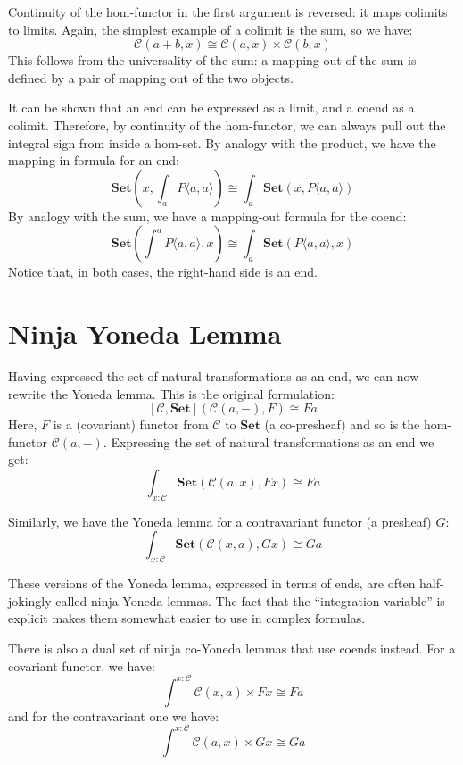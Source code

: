 \documentclass[DaoFP]{subfiles}
\begin{document}
Continuity of the hom-functor in the first argument is reversed: it maps colimits to limits. Again, the simplest example of a colimit is the sum, so we have:
\[ \mathcal{C}(a + b, x) \cong \mathcal{C}(a, x) \times \mathcal{C}(b, x) \]
This follows from the universality of the sum: a mapping out of the sum is defined by a pair of mapping out of the two objects.

It can be shown that an end can be expressed as a limit, and a coend as a colimit. Therefore, by continuity of the hom-functor, we can always pull out the integral sign from inside a hom-set. By analogy with the product, we have the mapping-in formula for an end:
\[ \mathbf{Set}\left(x, \int_a P\langle a, a \rangle \right) \cong \int_a  \mathbf{Set}(x, P\langle a, a \rangle) \]
By analogy with the sum, we have a mapping-out formula for the coend:
\[ \mathbf{Set}\left( \int^a P\langle a, a \rangle , x\right) \cong \int_a  \mathbf{Set}(P\langle a, a \rangle, x) \]
Notice that, in both cases, the right-hand side is an end.

\section{Ninja Yoneda Lemma}

Having expressed the set of natural transformations as an end, we can now rewrite the Yoneda lemma. This is the original formulation:
\[ [\mathcal{C}, \mathbf{Set}]( \mathcal{C}(a, -), F) \cong F a \]
Here, $F$ is a (covariant) functor from $\mathcal{C}$ to $\mathbf{Set}$ (a co-presheaf) and so is the hom-functor $\mathcal{C}(a, -)$. 
Expressing the set of natural transformations as an end we get:
\[ \int_{x \colon \mathcal{C}} \mathbf{Set} (\mathcal{C}(a, x), F x) \cong F a \]

Similarly, we have the Yoneda lemma for a contravariant functor (a presheaf) $G$:
\[ \int_{x \colon \mathcal{C}} \mathbf{Set} (\mathcal{C}(x, a), G x) \cong G a \]

These versions of the Yoneda lemma, expressed in terms of ends, are often half-jokingly called ninja-Yoneda lemmas. The fact that the ``integration variable'' is explicit makes them somewhat easier to use in complex formulas.

There is also a dual set of ninja co-Yoneda lemmas that use coends instead. For a covariant functor, we have:
\[ \int^{x \colon \mathcal{C}} \mathcal{C}(x, a) \times F x \cong F a \]
and for the contravariant one we have:
\[ \int^{x \colon \mathcal{C}} \mathcal{C}(a, x) \times G x \cong G a \]
\end{document}
